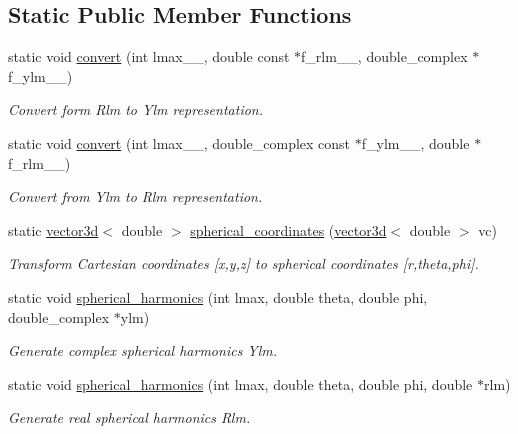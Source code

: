 \subsection*{Static Public Member Functions}
\begin{DoxyCompactItemize}
\item 
static void \hyperlink{classsirius_1_1_s_h_t_a5034e691a9b7a4842eda130d48fa5b9d}{convert} (int lmax\+\_\+\+\_\+, double const $\ast$f\+\_\+rlm\+\_\+\+\_\+, double\+\_\+complex $\ast$f\+\_\+ylm\+\_\+\+\_\+)
\begin{DoxyCompactList}\small\item\em Convert form Rlm to Ylm representation. \end{DoxyCompactList}\item 
static void \hyperlink{classsirius_1_1_s_h_t_aa3ec91549ae0cc6cd807084db4efe4f4}{convert} (int lmax\+\_\+\+\_\+, double\+\_\+complex const $\ast$f\+\_\+ylm\+\_\+\+\_\+, double $\ast$f\+\_\+rlm\+\_\+\+\_\+)
\begin{DoxyCompactList}\small\item\em Convert from Ylm to Rlm representation. \end{DoxyCompactList}\item 
static \hyperlink{classgeometry3d_1_1vector3d}{vector3d}$<$ double $>$ \hyperlink{classsirius_1_1_s_h_t_aefa5c001f82b0fcb828e4b1ef245f290}{spherical\+\_\+coordinates} (\hyperlink{classgeometry3d_1_1vector3d}{vector3d}$<$ double $>$ vc)
\begin{DoxyCompactList}\small\item\em Transform Cartesian coordinates \mbox{[}x,y,z\mbox{]} to spherical coordinates \mbox{[}r,theta,phi\mbox{]}. \end{DoxyCompactList}\item 
static void \hyperlink{classsirius_1_1_s_h_t_af5c2033cf136739e3f253d1b93adf1c1}{spherical\+\_\+harmonics} (int lmax, double theta, double phi, double\+\_\+complex $\ast$ylm)
\begin{DoxyCompactList}\small\item\em Generate complex spherical harmonics Ylm. \end{DoxyCompactList}\item 
static void \hyperlink{classsirius_1_1_s_h_t_a368837b3cdb113d52c2067e7fa677400}{spherical\+\_\+harmonics} (int lmax, double theta, double phi, double $\ast$rlm)
\begin{DoxyCompactList}\small\item\em Generate real spherical harmonics Rlm. \end{DoxyCompactList}\item 

\end{DoxyCompactItemize}
